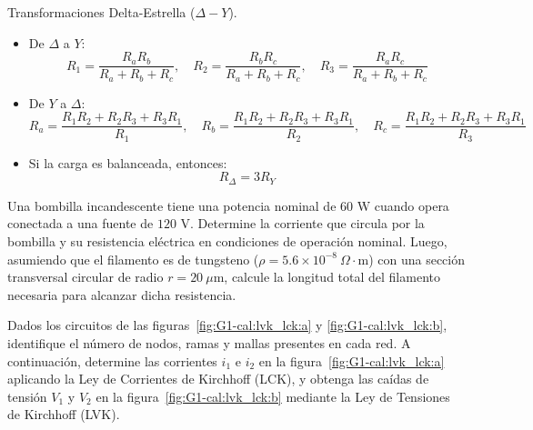 \documentclass[11pt]{article}
\begin{document}
\begin{boxTeoria}{Transformaciones Delta-Estrella ($\Delta - Y$).}

    \begin{itemize}
        \item De $\Delta$ a $Y$:
              \begin{equation*}
                  R_1 = \frac{R_a R_b}{R_a + R_b + R_c}, \quad
                  R_2 = \frac{R_b R_c}{R_a + R_b + R_c}, \quad
                  R_3 = \frac{R_a R_c}{R_a + R_b + R_c}
              \end{equation*}
        \item De $Y$ a $\Delta$:
              \begin{equation*}
                  R_a = \frac{R_1 R_2 + R_2 R_3 + R_3 R_1}{R_1}, \quad
                  R_b = \frac{R_1 R_2 + R_2 R_3 + R_3 R_1}{R_2}, \quad
                  R_c = \frac{R_1 R_2 + R_2 R_3 + R_3 R_1}{R_3}
              \end{equation*}
        \item Si la carga es balanceada, entonces:
              \begin{equation*}
                  R_\Delta = 3R_Y
              \end{equation*}
    \end{itemize}

\end{boxTeoria}

\newpage
{} Una bombilla incandescente tiene una potencia nominal de $60\text{ W}$ cuando opera conectada a una fuente de $120\text{ V}$. Determine la corriente que circula por la bombilla y su resistencia eléctrica en condiciones de operación nominal. Luego, asumiendo que el filamento es de tungsteno ($\rho = 5.6 \times 10^{-8}\ \Omega\cdot\text{m}$) con una sección transversal circular de radio $r = 20\ \mu\text{m}$, calcule la longitud total del filamento necesaria para alcanzar dicha resistencia.

 Dados los circuitos de las figuras~\ref{fig:G1-cal:lvk_lck:a} y \ref{fig:G1-cal:lvk_lck:b}, identifique el número de nodos, ramas y mallas presentes en cada red. A continuación, determine las corrientes $i_1$ e $i_2$ en la figura~\ref{fig:G1-cal:lvk_lck:a} aplicando la Ley de Corrientes de Kirchhoff (LCK), y obtenga las caídas de tensión $V_1$ y $V_2$ en la figura~\ref{fig:G1-cal:lvk_lck:b} mediante la Ley de Tensiones de Kirchhoff (LVK).
\end{document}
